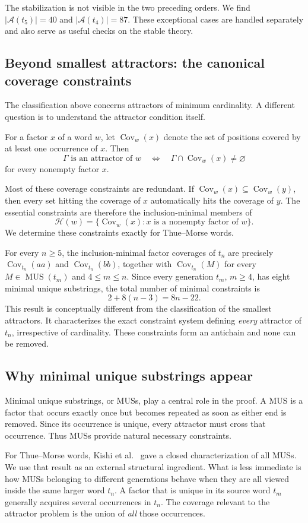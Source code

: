 \documentclass[11pt,a4paper]{article}
\theoremstyle{definition}\newtheorem{definition}[theorem]{Definition}
\theoremstyle{remark}\newtheorem{remark}[theorem]{Remark}
\newcommand{\Cov}{\operatorname{Cov}}
\newcommand{\MUS}{\operatorname{MUS}}
\newcommand{\Acal}{\mathcal{A}}
\begin{document}
The stabilization is not visible in the two preceding orders. We find $|\Acal(t_5)|=40$ and $|\Acal(t_4)|=87$. These exceptional cases are handled separately and also serve as useful checks on the stable theory.

\subsection{Beyond smallest attractors: the canonical coverage constraints}
The classification above concerns attractors of minimum cardinality. A different question is to understand the attractor condition itself.

For a factor $x$ of a word $w$, let $\Cov_w(x)$ denote the set of positions covered by at least one occurrence of $x$. Then
\[
\Gamma\text{ is an attractor of }w
\quad\Longleftrightarrow\quad
\Gamma\cap\Cov_w(x)\neq\varnothing
\]
for every nonempty factor $x$.

Most of these coverage constraints are redundant. If $\Cov_w(x)\subseteq\Cov_w(y)$, then every set hitting the coverage of $x$ automatically hits the coverage of $y$. The essential constraints are therefore the inclusion-minimal members of
\[
\mathcal H(w)=\{\Cov_w(x):x\text{ is a nonempty factor of }w\}.
\]
We determine these constraints exactly for Thue--Morse words.

For every $n\geq5$, the inclusion-minimal factor coverages of $t_n$ are precisely $\Cov_{t_n}(aa)$ and $\Cov_{t_n}(bb)$, together with $\Cov_{t_n}(M)$ for every $M\in\MUS(t_m)$ and $4\leq m\leq n$. Since every generation $t_m$, $m\geq4$, has eight minimal unique substrings, the total number of minimal constraints is
\[
2+8(n-3)=8n-22.
\]
This result is conceptually different from the classification of the smallest attractors. It characterizes the exact constraint system defining \emph{every} attractor of $t_n$, irrespective of cardinality. These constraints form an antichain and none can be removed.

\subsection{Why minimal unique substrings appear}
Minimal unique substrings, or MUSs, play a central role in the proof. A MUS is a factor that occurs exactly once but becomes repeated as soon as either end is removed. Since its occurrence is unique, every attractor must cross that occurrence. Thus MUSs provide natural necessary constraints.

For Thue--Morse words, Kishi et al.~\cite{Kishi2026} gave a closed characterization of all MUSs. We use that result as an external structural ingredient. What is less immediate is how MUSs belonging to different generations behave when they are all viewed inside the same larger word $t_n$. A factor that is unique in its source word $t_m$ generally acquires several occurrences in $t_n$. The coverage relevant to the attractor problem is the union of \emph{all} those occurrences.
\end{document}
